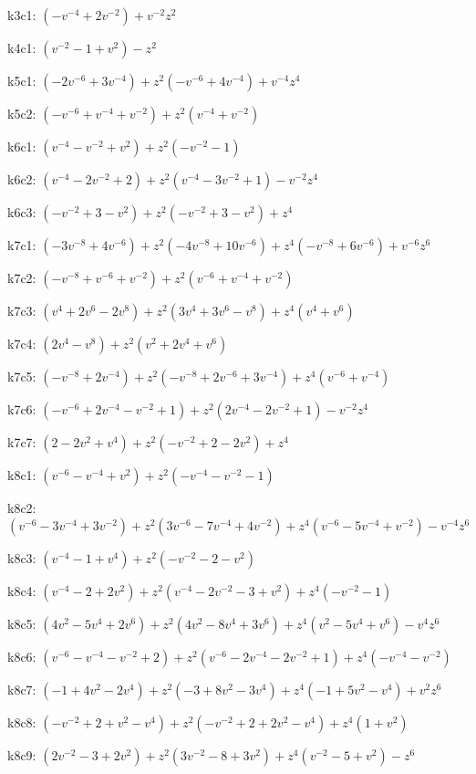 k3c1: $ (-v^{-4}+2v^{-2})  +v^{-2}z^{2} $ 

k4c1: $ (v^{-2}-1+v^{2})  -z^{2} $ 

k5c1: $ (-2v^{-6}+3v^{-4})  +z^{2}(-v^{-6}+4v^{-4})  +v^{-4}z^{4} $ 

k5c2: $ (-v^{-6}+v^{-4}+v^{-2})  +z^{2}(v^{-4}+v^{-2}) $ 

k6c1: $ (v^{-4}-v^{-2}+v^{2})  +z^{2}(-v^{-2}-1) $ 

k6c2: $ (v^{-4}-2v^{-2}+2)  +z^{2}(v^{-4}-3v^{-2}+1)  -v^{-2}z^{4} $ 

k6c3: $ (-v^{-2}+3-v^{2})  +z^{2}(-v^{-2}+3-v^{2})  +z^{4} $ 

k7c1: $ (-3v^{-8}+4v^{-6})  +z^{2}(-4v^{-8}+10v^{-6})  +z^{4}(-v^{-8}+6v^{-6})  +v^{-6}z^{6} $ 

k7c2: $ (-v^{-8}+v^{-6}+v^{-2})  +z^{2}(v^{-6}+v^{-4}+v^{-2}) $ 

k7c3: $ (v^{4}+2v^{6}-2v^{8})  +z^{2}(3v^{4}+3v^{6}-v^{8})  +z^{4}(v^{4}+v^{6}) $ 

k7c4: $ (2v^{4}-v^{8})  +z^{2}(v^{2}+2v^{4}+v^{6}) $ 

k7c5: $ (-v^{-8}+2v^{-4})  +z^{2}(-v^{-8}+2v^{-6}+3v^{-4})  +z^{4}(v^{-6}+v^{-4}) $ 

k7c6: $ (-v^{-6}+2v^{-4}-v^{-2}+1)  +z^{2}(2v^{-4}-2v^{-2}+1)  -v^{-2}z^{4} $ 

k7c7: $ (2-2v^{2}+v^{4})  +z^{2}(-v^{-2}+2-2v^{2})  +z^{4} $ 

k8c1: $ (v^{-6}-v^{-4}+v^{2})  +z^{2}(-v^{-4}-v^{-2}-1) $ 

k8c2: $ (v^{-6}-3v^{-4}+3v^{-2})  +z^{2}(3v^{-6}-7v^{-4}+4v^{-2})  +z^{4}(v^{-6}-5v^{-4}+v^{-2})  -v^{-4}z^{6} $ 

k8c3: $ (v^{-4}-1+v^{4})  +z^{2}(-v^{-2}-2-v^{2}) $ 

k8c4: $ (v^{-4}-2+2v^{2})  +z^{2}(v^{-4}-2v^{-2}-3+v^{2})  +z^{4}(-v^{-2}-1) $ 

k8c5: $ (4v^{2}-5v^{4}+2v^{6})  +z^{2}(4v^{2}-8v^{4}+3v^{6})  +z^{4}(v^{2}-5v^{4}+v^{6})  -v^{4}z^{6} $ 

k8c6: $ (v^{-6}-v^{-4}-v^{-2}+2)  +z^{2}(v^{-6}-2v^{-4}-2v^{-2}+1)  +z^{4}(-v^{-4}-v^{-2}) $ 

k8c7: $ (-1+4v^{2}-2v^{4})  +z^{2}(-3+8v^{2}-3v^{4})  +z^{4}(-1+5v^{2}-v^{4})  +v^{2}z^{6} $ 

k8c8: $ (-v^{-2}+2+v^{2}-v^{4})  +z^{2}(-v^{-2}+2+2v^{2}-v^{4})  +z^{4}(1+v^{2}) $ 

k8c9: $ (2v^{-2}-3+2v^{2})  +z^{2}(3v^{-2}-8+3v^{2})  +z^{4}(v^{-2}-5+v^{2})  -z^{6} $ 

